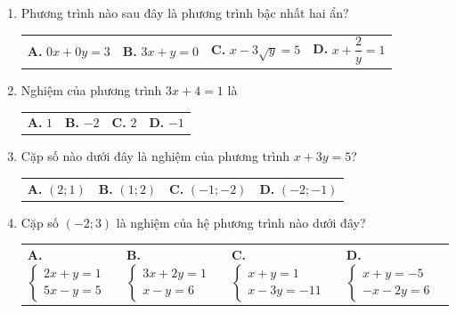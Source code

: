 \documentclass[12pt,a4paper]{article}
\begin{document}
\begin{enumerate}[label=\textbf{Câu \arabic*.}, leftmargin=*, itemsep=4.5pt, parsep=0pt]
  \item Phương trình nào sau đây là phương trình bậc nhất hai ẩn?
  \begin{flushleft}
    \begin{tabularx}{\linewidth}{X X X X}
      \textbf{A.} $0x + 0y = 3$ & 
      \textbf{B.} $3x + y = 0$ & 
      \textbf{C.} $x - 3\sqrt{y} = 5$ & 
      \textbf{D.} $x + \dfrac{2}{y} = 1$
    \end{tabularx}
  \end{flushleft}

  \item Nghiệm của phương trình $3x + 4 = 1$ là
  \begin{flushleft}
    \begin{tabularx}{\linewidth}{X X X X}
      \textbf{A.} $1$ & 
      \textbf{B.} $-2$ & 
      \textbf{C.} $2$ & 
      \textbf{D.} $-1$
    \end{tabularx}
  \end{flushleft}

  \item Cặp số nào dưới đây là nghiệm của phương trình $x + 3y = 5$?
  \begin{flushleft}
    \begin{tabularx}{\linewidth}{X X X X}
      \textbf{A.} $(2; 1)$ & 
      \textbf{B.} $(1; 2)$ & 
      \textbf{C.} $(-1; -2)$ & 
      \textbf{D.} $(-2; -1)$
    \end{tabularx}
  \end{flushleft}

  \item Cặp số $(-2; 3)$ là nghiệm của hệ phương trình nào dưới đây?
  \begin{flushleft}
    \begin{tabularx}{\linewidth}{X X X X}
      \textbf{A.} $\begin{cases} 2x + y = 1 \\ 5x - y = 5 \end{cases}$ & 
      \textbf{B.} $\begin{cases} 3x + 2y = 1 \\ x - y = 6 \end{cases}$ & 
      \textbf{C.} $\begin{cases} x + y = 1 \\ x - 3y = -11 \end{cases}$ & 
      \textbf{D.} $\begin{cases} x + y = -5 \\ -x - 2y = 6 \end{cases}$
    \end{tabularx}
  \end{flushleft}


\end{enumerate}
\end{document}
